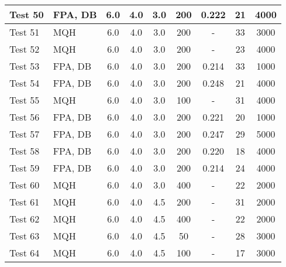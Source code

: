 \begin{table}[!h]
\begin{center}
\begin{tabular}{|l|l|c|c|c|c|c|c|c|}
Test 50    &  FPA, DB           &  6.0       &  4.0       &  3.0       &  200            &  0.222          &  21                &  4000            \\ \hline
Test 51    &  MQH               &  6.0       &  4.0       &  3.0       &  200            &  -              &  33                &  3000            \\ \hline
Test 52    &  MQH               &  6.0       &  4.0       &  3.0       &  200            &  -              &  23                &  4000            \\ \hline
Test 53    &  FPA, DB           &  6.0       &  4.0       &  3.0       &  200            &  0.214          &  33                &  1000            \\ \hline
Test 54    &  FPA, DB           &  6.0       &  4.0       &  3.0       &  200            &  0.248          &  21                &  4000            \\ \hline
Test 55    &  MQH               &  6.0       &  4.0       &  3.0       &  100            &  -              &  31                &  4000            \\ \hline
Test 56    &  FPA, DB           &  6.0       &  4.0       &  3.0       &  200            &  0.221          &  20                &  1000            \\ \hline
Test 57    &  FPA, DB           &  6.0       &  4.0       &  3.0       &  200            &  0.247          &  29                &  5000            \\ \hline
Test 58    &  FPA, DB           &  6.0       &  4.0       &  3.0       &  200            &  0.220          &  18                &  4000            \\ \hline
Test 59    &  FPA, DB           &  6.0       &  4.0       &  3.0       &  200            &  0.214          &  24                &  4000            \\ \hline
Test 60    &  MQH               &  6.0       &  4.0       &  3.0       &  400            &  -              &  22                &  2000            \\ \hline
Test 61    &  MQH               &  6.0       &  4.0       &  4.5       &  200            &  -              &  31                &  2000            \\ \hline
Test 62    &  MQH               &  6.0       &  4.0       &  4.5       &  400            &  -              &  22                &  2000            \\ \hline
Test 63    &  MQH               &  6.0       &  4.0       &  4.5       &  50             &  -              &  28                &  3000            \\ \hline
Test 64    &  MQH               &  6.0       &  4.0       &  4.5       &  100            &  -              &  17                &  3000            \\ \hline
\end{tabular}
\end{center}
\end{table}


